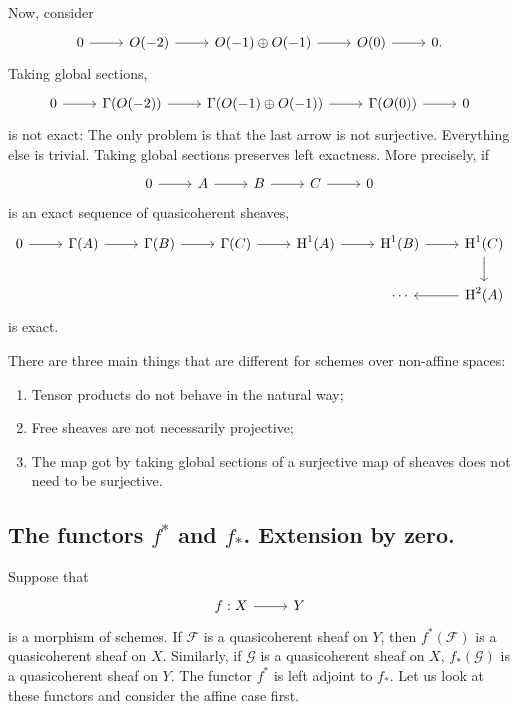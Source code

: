 \documentclass [11 pt, oneside] {article}
\begin{document}
Now, consider 
\[
\begin{tikzcd}
	0\ar[r]&\mathscr{O}(-2) \ar[r] &\mathscr{O}(-1) \oplus \mathscr{O}(-1) \ar[r] & \mathscr{O}(0) \ar[r] &0.
\end{tikzcd}
\]
Taking global sections,
\[
\begin{tikzcd}
	0\ar[r]&\Gamma(\mathscr{O}(-2)) \ar[r] &\Gamma (\mathscr{O}(-1) \oplus \mathscr{O}(-1)) \ar[r] & \Gamma(\mathscr{O}(0)) \ar[r] &0
\end{tikzcd}
\]
is not exact: The only problem is that the last arrow is not surjective. Everything else is trivial. Taking global sections preserves left exactness. More precisely, if
\[
\begin{tikzcd}
	0\ar[r]&\mathscr{A}\ar[r]&\mathscr{B}\ar[r]&\mathscr{C}\ar[r]&0
\end{tikzcd}
\]
is an exact sequence of quasicoherent sheaves,
\[
\begin{tikzcd}
	0\ar[r] &\Gamma(\mathscr{A}) \ar[r]& \Gamma(\mathscr{B})\ar[r]&\Gamma(\mathscr{C}) \ar[r]&\HH^1(\mathscr{A}) \ar[r]&\HH^1(\mathscr{B}) \ar[r]&\HH^1(\mathscr{C})\ar[d]\\&&&&&\cdots&\HH^2(\mathscr{A}) \ar[l]
\end{tikzcd}
\]
is exact.

There are three main things that are different for schemes over non-affine spaces:
\begin{enumerate}
	\item Tensor products do not behave in the natural way;
	\item Free sheaves are not necessarily projective;
	\item The map got by taking global sections of a surjective map of sheaves does not need to be surjective.
\end{enumerate}

\subsection{The functors \texorpdfstring{$f^*$}{f*} and \texorpdfstring{$f_*$}{f*}. Extension by zero.}
Suppose that 
\[
\begin{tikzcd}
f:X\ar[r]&Y
\end{tikzcd}
\]  
is a morphism of schemes. If $\mathscr{F}$ is a quasicoherent sheaf on $Y$, then $f^*(\mathscr{F})$ is a quasicoherent sheaf on $X$. Similarly, if $\mathscr{G}$ is a quasicoherent sheaf on $X$, $f_*(\mathscr{G})$ is a quasicoherent sheaf on $Y$. The functor $f^*$ is left adjoint to $f_*$. Let us look at these functors and consider the affine case first. 
\end{document}
